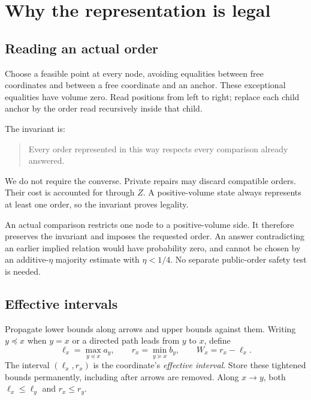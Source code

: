 \section{Why the representation is legal}\label{sec:legal}

\subsection{Reading an actual order}

Choose a feasible point at every node, avoiding equalities between free coordinates and between a free coordinate and an anchor. These exceptional equalities have volume zero. Read positions from left to right; replace each child anchor by the order read recursively inside that child.

The invariant is:
\begin{quote}
Every order represented in this way respects every comparison already answered.
\end{quote}
We do not require the converse. Private repairs may discard compatible orders. Their cost is accounted for through \(Z\). A positive-volume state always represents at least one order, so the invariant proves legality.

An actual comparison restricts one node to a positive-volume side. It therefore preserves the invariant and imposes the requested order. An answer contradicting an earlier implied relation would have probability zero, and cannot be chosen by an additive-\(\eta\) majority estimate with \(\eta<1/4\). No separate public-order safety test is needed.

\subsection{Effective intervals}

Propagate lower bounds along arrows and upper bounds against them. Writing \(y\preceq x\) when \(y=x\) or a directed path leads from \(y\) to \(x\), define
\[
\ell_x=\max_{y\preceq x}a_y,\qquad
r_x=\min_{y\succeq x}b_y,\qquad W_x=r_x-\ell_x.
\]
The interval \((\ell_x,r_x)\) is the coordinate's \emph{effective interval}. Store these tightened bounds permanently, including after arrows are removed. Along \(x\to y\), both \(\ell_x\le\ell_y\) and \(r_x\le r_y\).

